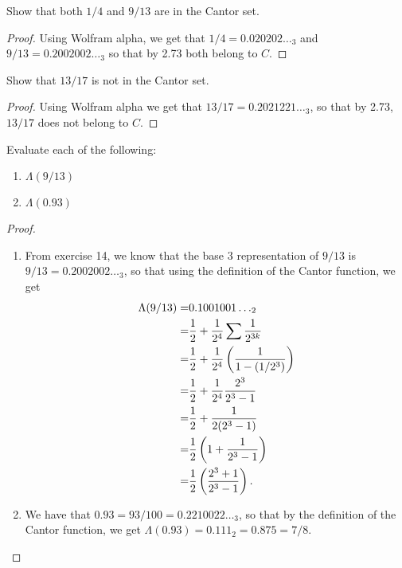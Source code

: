 \begin{exercise}{14}
Show that both $1/4$ and $9/13$ are in the Cantor set.
\end{exercise}
\begin{proof}
Using Wolfram alpha, we get that $1/4 = 0.020202\dots_3$ and $9/13 = 0.2002002\dots_3$ so that by 2.73 both belong to $C$.
\end{proof} 

\begin{exercise}{15}
Show that $13/17$ is not in the Cantor set.
\end{exercise}
\begin{proof}
Using Wolfram alpha we get that $13/17 = 0.2021221\dots_3$, so that by 2.73, $13/17$ does not belong to $C$.
\end{proof} 

\begin{exercise}{20}
Evaluate each of the following:
\begin{enumerate}
    \item $\Lambda(9/13)$
    \item $\Lambda(0.93)$
\end{enumerate}
\end{exercise}
\begin{proof}
\begin{enumerate}
    \item From exercise 14, we know that the base 3 representation of $9/13$ is $9/13 = 0.2002002\dots_3$, so that using the definition of the Cantor function, we get 
    \begin{align*}
        \Lambda(9/13) 
        =& 0.1001001\dots_2\\
        =& \frac{1}{2} + \frac{1}{2^4} \sum \frac{1}{2^{3k}}\\
        =& \frac{1}{2} + \frac{1}{2^4} \left( \frac{1}{1-(1/2^3)}\right)\\
        =& \frac{1}{2} + \frac{1}{2^4} \frac{2^3}{2^3-1}\\
        =& \frac{1}{2} + \frac{1}{2(2^3-1)}\\
        =& \frac{1}{2}\left( 1 + \frac{1}{2^3-1}\right)\\
        =& \frac{1}{2}\left( \frac{2^3 + 1}{2^3-1}\right).
    \end{align*}
    \item We have that $0.93 = 93/100 = 0.2210022\dots_3$, so that by the definition of the Cantor function, we get $\Lambda(0.93) = 0.111_2 = 0.875 = 7/8$.
\end{enumerate}
\end{proof} 


